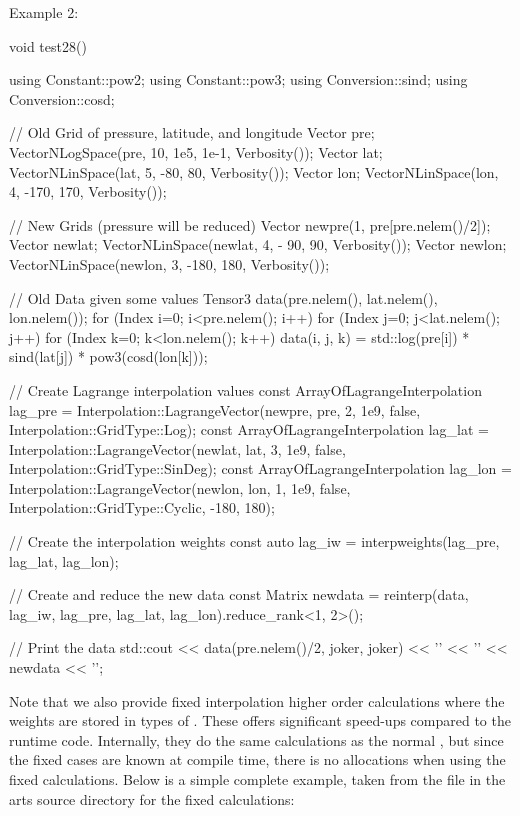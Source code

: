 Example 2:
\begin{code}
void test28() {
  using Constant::pow2;
  using Constant::pow3;
  using Conversion::sind;
  using Conversion::cosd;
  
  // Old Grid of pressure, latitude, and longitude
  Vector pre; VectorNLogSpace(pre, 10, 1e5, 1e-1, Verbosity()); 
  Vector lat; VectorNLinSpace(lat, 5, -80, 80, Verbosity());
  Vector lon; VectorNLinSpace(lon, 4, -170, 170, Verbosity());
  
  // New Grids (pressure will be reduced)
  Vector newpre(1, pre[pre.nelem()/2]); 
  Vector newlat; VectorNLinSpace(newlat, 4, - 90,  90, Verbosity());
  Vector newlon; VectorNLinSpace(newlon, 3, -180, 180, Verbosity());
  
  // Old Data given some values
  Tensor3 data(pre.nelem(), lat.nelem(), lon.nelem());
  for (Index i=0; i<pre.nelem(); i++) {
    for (Index j=0; j<lat.nelem(); j++) {
      for (Index k=0; k<lon.nelem(); k++) {
        data(i, j, k) =
          std::log(pre[i]) * sind(lat[j]) * pow3(cosd(lon[k]));
      }
    }
  }
  
  // Create Lagrange interpolation values
  const ArrayOfLagrangeInterpolation lag_pre =
    Interpolation::LagrangeVector(newpre, pre, 2, 1e9, false,
      Interpolation::GridType::Log);
  const ArrayOfLagrangeInterpolation lag_lat =
    Interpolation::LagrangeVector(newlat, lat, 3, 1e9, false,
      Interpolation::GridType::SinDeg);
  const ArrayOfLagrangeInterpolation lag_lon =
    Interpolation::LagrangeVector(newlon, lon, 1, 1e9, false,
      Interpolation::GridType::Cyclic, {-180, 180});
  
  // Create the interpolation weights
  const auto lag_iw = interpweights(lag_pre, lag_lat, lag_lon);
  
  // Create and reduce the new data
  const Matrix newdata = reinterp(data,
    lag_iw, lag_pre, lag_lat, lag_lon).reduce_rank<1, 2>();
  
  // Print the data
  std::cout << data(pre.nelem()/2, joker, joker) 
            << '\n' << '\n' << newdata << '\n';
}
\end{code}


Note that we also provide fixed interpolation higher order calculations where
the weights are stored in types of .
These offers significant speed-ups compared to the runtime code.  Internally,
they do the same calculations as the normal ,
but since the fixed cases are known at compile time, there is no allocations
when using the fixed calculations. Below is a simple complete example, taken from
the file  in the arts source directory for the fixed calculations: 

